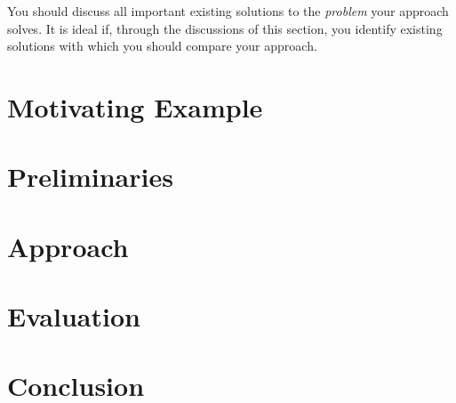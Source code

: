 You should discuss all important existing solutions to the \emph{problem} your approach solves.
It is ideal if, through the discussions of this section, you identify existing solutions with which you should compare your approach.

\section{Motivating Example}
\label{sec:motivating:example}

\section{Preliminaries}
\label{sec:preliminaries}

\section{Approach}
\label{sec:approach}

\section{Evaluation}
\label{sec:evaluation}

\section{Conclusion}
\label{sec:conclusion}


%



\newpage
\listoftodos

 
